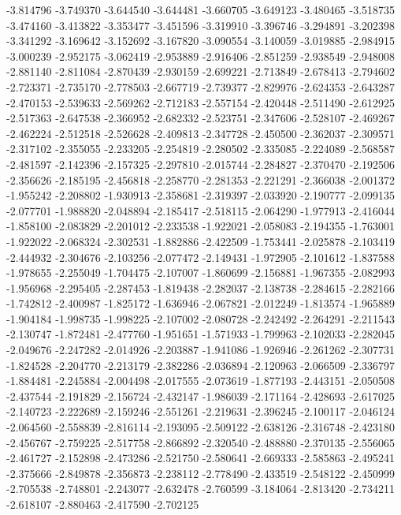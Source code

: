 -3.814796
-3.749370
-3.644540
-3.644481
-3.660705
-3.649123
-3.480465
-3.518735
-3.474160
-3.413822
-3.353477
-3.451596
-3.319910
-3.396746
-3.294891
-3.202398
-3.341292
-3.169642
-3.152692
-3.167820
-3.090554
-3.140059
-3.019885
-2.984915
-3.000239
-2.952175
-3.062419
-2.953889
-2.916406
-2.851259
-2.938549
-2.948008
-2.881140
-2.811084
-2.870439
-2.930159
-2.699221
-2.713849
-2.678413
-2.794602
-2.723371
-2.735170
-2.778503
-2.667719
-2.739377
-2.829976
-2.624353
-2.643287
-2.470153
-2.539633
-2.569262
-2.712183
-2.557154
-2.420448
-2.511490
-2.612925
-2.517363
-2.647538
-2.366952
-2.682332
-2.523751
-2.347606
-2.528107
-2.469267
-2.462224
-2.512518
-2.526628
-2.409813
-2.347728
-2.450500
-2.362037
-2.309571
-2.317102
-2.355055
-2.233205
-2.254819
-2.280502
-2.335085
-2.224089
-2.568587
-2.481597
-2.142396
-2.157325
-2.297810
-2.015744
-2.284827
-2.370470
-2.192506
-2.356626
-2.185195
-2.456818
-2.258770
-2.281353
-2.221291
-2.366038
-2.001372
-1.955242
-2.208802
-1.930913
-2.358681
-2.319397
-2.033920
-2.190777
-2.099135
-2.077701
-1.988820
-2.048894
-2.185417
-2.518115
-2.064290
-1.977913
-2.416044
-1.858100
-2.083829
-2.201012
-2.233538
-1.922021
-2.058083
-2.194355
-1.763001
-1.922022
-2.068324
-2.302531
-1.882886
-2.422509
-1.753441
-2.025878
-2.103419
-2.444932
-2.304676
-2.103256
-2.077472
-2.149431
-1.972905
-2.101612
-1.837588
-1.978655
-2.255049
-1.704475
-2.107007
-1.860699
-2.156881
-1.967355
-2.082993
-1.956968
-2.295405
-2.287453
-1.819438
-2.282037
-2.138738
-2.284615
-2.282166
-1.742812
-2.400987
-1.825172
-1.636946
-2.067821
-2.012249
-1.813574
-1.965889
-1.904184
-1.998735
-1.998225
-2.107002
-2.080728
-2.242492
-2.264291
-2.211543
-2.130747
-1.872481
-2.477760
-1.951651
-1.571933
-1.799963
-2.102033
-2.282045
-2.049676
-2.247282
-2.014926
-2.203887
-1.941086
-1.926946
-2.261262
-2.307731
-1.824528
-2.204770
-2.213179
-2.382286
-2.036894
-2.120963
-2.066509
-2.336797
-1.884481
-2.245884
-2.004498
-2.017555
-2.073619
-1.877193
-2.443151
-2.050508
-2.437544
-2.191829
-2.156724
-2.432147
-1.986039
-2.171164
-2.428693
-2.617025
-2.140723
-2.222689
-2.159246
-2.551261
-2.219631
-2.396245
-2.100117
-2.046124
-2.064560
-2.558839
-2.816114
-2.193095
-2.509122
-2.638126
-2.316748
-2.423180
-2.456767
-2.759225
-2.517758
-2.866892
-2.320540
-2.488880
-2.370135
-2.556065
-2.461727
-2.152898
-2.473286
-2.521750
-2.580641
-2.669333
-2.585863
-2.495241
-2.375666
-2.849878
-2.356873
-2.238112
-2.778490
-2.433519
-2.548122
-2.450999
-2.705538
-2.748801
-2.243077
-2.632478
-2.760599
-3.184064
-2.813420
-2.734211
-2.618107
-2.880463
-2.417590
-2.702125
